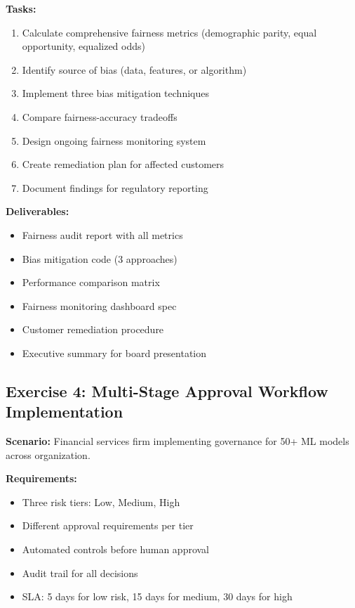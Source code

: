 \textbf{Tasks:}
\begin{enumerate}
    \item Calculate comprehensive fairness metrics (demographic parity, equal opportunity, equalized odds)
    \item Identify source of bias (data, features, or algorithm)
    \item Implement three bias mitigation techniques
    \item Compare fairness-accuracy tradeoffs
    \item Design ongoing fairness monitoring system
    \item Create remediation plan for affected customers
    \item Document findings for regulatory reporting
\end{enumerate}

\textbf{Deliverables:}
\begin{itemize}
    \item Fairness audit report with all metrics
    \item Bias mitigation code (3 approaches)
    \item Performance comparison matrix
    \item Fairness monitoring dashboard spec
    \item Customer remediation procedure
    \item Executive summary for board presentation
\end{itemize}

\subsection{Exercise 4: Multi-Stage Approval Workflow Implementation}

\textbf{Scenario:} Financial services firm implementing governance for 50+ ML models across organization.

\textbf{Requirements:}
\begin{itemize}
    \item Three risk tiers: Low, Medium, High
    \item Different approval requirements per tier
    \item Automated controls before human approval
    \item Audit trail for all decisions
    \item SLA: 5 days for low risk, 15 days for medium, 30 days for high
\end{itemize}

